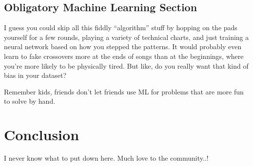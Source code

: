 \documentclass[10pt]{sigplanconf}
\begin{document}
\subsection{Obligatory Machine Learning Section}

I guess you could skip all this fiddly ``algorithm'' stuff by
hopping on the pads yourself for a few rounds, playing a variety of technical charts,
and just training a neural network based on how you stepped the patterns.
It would probably even learn to fake crossovers more at the ends of songs than at the beginnings,
where you're more likely to be physically tired.
But like, do you really want that kind of bias in your dataset?

Remember kids, friends don't let friends use ML for problems that are more fun to solve by hand.

\section{Conclusion}

I never know what to put down here. Much love to the community..!





\end{document}

